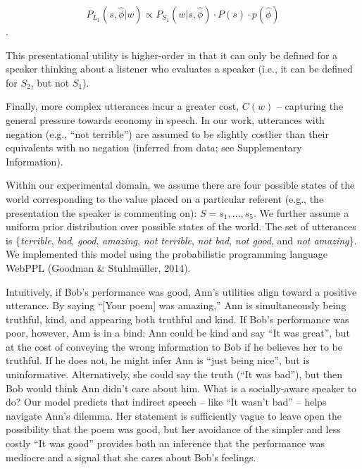 \documentclass[floatsintext,mask,man]{apa6}
\theoremstyle{definition}
\theoremstyle{definition}
\theoremstyle{definition}
\theoremstyle{remark}
\begin{document}
\[P_{L_1}(s, \hat{\phi} | w) \propto P_{S_1}(w | s, \hat{\phi}) \cdot P(s) \cdot p(\hat{\phi})\].

This presentational utility is higher-order in that it can only be
defined for a speaker thinking about a listener who evaluates a speaker
(i.e., it can be defined for \(S_2\), but not \(S_1\)).

Finally, more complex utterances incur a greater cost, \(C(w)\) --
capturing the general pressure towards economy in speech. In our work,
utterances with negation (e.g., \enquote{not terrible}) are assumed to
be slightly costlier than their equivalents with no negation (inferred
from data; see Supplementary Information).

Within our experimental domain, we assume there are four possible states
of the world corresponding to the value placed on a particular referent
(e.g., the presentation the speaker is commenting on):
\(S = {s_1,...,s_5}\). We further assume a uniform prior distribution
over possible states of the world. The set of utterances is
\{\emph{terrible}, \emph{bad}, \emph{good}, \emph{amazing}, \emph{not
terrible}, \emph{not bad}, \emph{not good}, and \emph{not amazing}\}. We
implemented this model using the probabilistic programming language
WebPPL (Goodman \& Stuhlmüller, 2014).

Intuitively, if Bob's performance was good, Ann's utilities align toward
a positive utterance. By saying \enquote{{[}Your poem{]} was amazing,}
Ann is simultaneously being truthful, kind, and appearing both truthful
and kind. If Bob's performance was poor, however, Ann is in a bind: Ann
could be kind and say \enquote{It was great}, but at the cost of
conveying the wrong information to Bob if he believes her to be
truthful. If he does not, he might infer Ann is \enquote{just being
nice}, but is uninformative. Alternatively, she could say the truth
(\enquote{It was bad}), but then Bob would think Ann didn't care about
him. What is a socially-aware speaker to do? Our model predicts that
indirect speech -- like \enquote{It wasn't bad} -- helps navigate Ann's
dilemma. Her statement is sufficiently vague to leave open the
possibility that the poem was good, but her avoidance of the simpler and
less costly \enquote{It was good} provides both an inference that the
performance was mediocre and a signal that she cares about Bob's
feelings.
\end{document}
